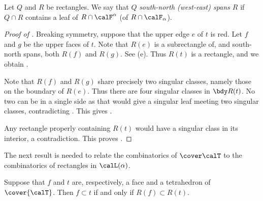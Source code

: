 \documentclass[12pt]{amsart}
\begin{document}
\begin{definition}
\label{Def:Spans}
Let $Q$ and $R$ be rectangles. We say that $Q$ \emph{south-north (west-east) spans $R$} if $Q \cap R$ contains a leaf of $R \cap \calF^\alpha$ (of $R \cap \calF_\alpha$). 
\end{definition}



\begin{proof}[Proof of ]
Breaking symmetry, suppose that the upper edge $e$ of $t$ is red.  Let $f$ and $g$ be the upper faces of $t$.  Note that $R(e)$ is a subrectangle of, and south-north spans, both $R(f)$ and $R(g)$.  See (e).   Thus $R(t)$ is a rectangle, and we obtain .

Note that $R(f)$ and $R(g)$ share precisely two singular classes, namely those on the boundary of $R(e)$.  Thus there are four singular classes in $\bdy R(t)$.  No two can be in a single side as that would give a singular leaf meeting two singular classes, contradicting .  This gives .  

Any rectangle properly containing $R(t)$ would have a singular class in its interior, a contradiction.  This proves .
\end{proof}

The next result is needed to relate the combinatorics of $\cover\calT$ to the combinatorics of rectangles in $\calL(\alpha)$. 

\begin{lemma}
\label{Lem:FaceInTet}
Suppose that $f$ and $t$ are, respectively, a face and a tetrahedron of $\cover{\calT}$.  Then $f \subset t$ if and only if $R(f) \subset R(t)$. 
\end{lemma}
\end{document}

